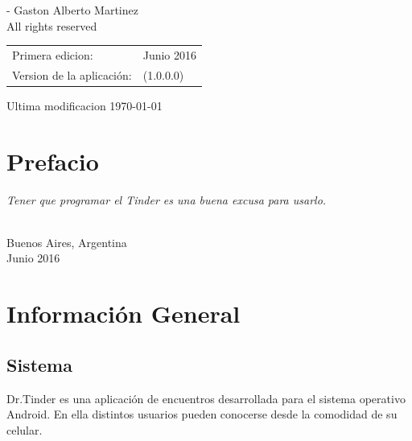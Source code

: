 \documentclass[10pt,letterpaper,extrafontsizes]{memoir}
\begin{document}
\begingroup
\footnotesize
\setlength{\parindent}{0pt}
\setlength{\parskip}{\baselineskip}
\textcopyright{} \the \year - Gaston Alberto Martinez\\
All rights reserved

\begin{center}
\begin{tabular}{ll}
Primera edicion:                        & Junio 2016 \\
Version de la aplicación: & (1.0.0.0)
\end{tabular}
\end{center}

Ultima modificacion \today


\endgroup

\clearpage
\vspace*{\fill}

\pagestyle{headings}

\tableofcontents
\vspace*{\fill}
\clearpage
\listoffigures
\clearpage
\listoftables
\clearpage

\chapter{Prefacio}

    \textit{Tener que programar el Tinder es una buena excusa para usarlo.}\\

{ \\ Buenos Aires, Argentina\\ Junio 2016\par}

\mainmatter

\chapter{Información General} \label{chap:infogeneral}

\section{Sistema}

Dr.Tinder es una aplicación de encuentros desarrollada para el sistema operativo Android. En ella distintos usuarios pueden conocerse desde la comodidad de su celular.
\end{document}
